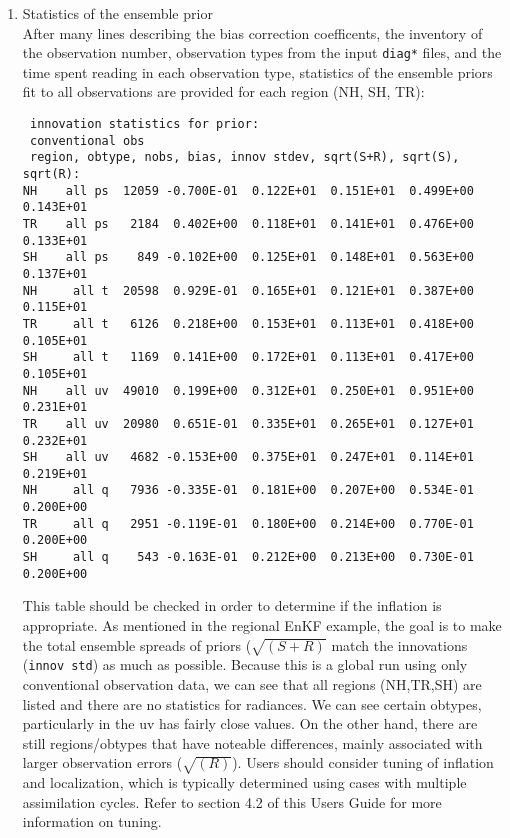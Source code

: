 \begin{enumerate}
\item Statistics of the ensemble prior \\
After many lines describing the bias correction coefficents, the inventory of the observation number, observation types from the input \verb|diag*| files, and the time spent reading in each observation type, statistics of the ensemble priors fit to all observations are provided for each region (NH, SH, TR):
\begin{footnotesize}
\begin{verbatim}
 innovation statistics for prior:
 conventional obs
 region, obtype, nobs, bias, innov stdev, sqrt(S+R), sqrt(S), sqrt(R):
NH    all ps  12059 -0.700E-01  0.122E+01  0.151E+01  0.499E+00  0.143E+01
TR    all ps   2184  0.402E+00  0.118E+01  0.141E+01  0.476E+00  0.133E+01
SH    all ps    849 -0.102E+00  0.125E+01  0.148E+01  0.563E+00  0.137E+01
NH     all t  20598  0.929E-01  0.165E+01  0.121E+01  0.387E+00  0.115E+01
TR     all t   6126  0.218E+00  0.153E+01  0.113E+01  0.418E+00  0.105E+01
SH     all t   1169  0.141E+00  0.172E+01  0.113E+01  0.417E+00  0.105E+01
NH    all uv  49010  0.199E+00  0.312E+01  0.250E+01  0.951E+00  0.231E+01
TR    all uv  20980  0.651E-01  0.335E+01  0.265E+01  0.127E+01  0.232E+01
SH    all uv   4682 -0.153E+00  0.375E+01  0.247E+01  0.114E+01  0.219E+01
NH     all q   7936 -0.335E-01  0.181E+00  0.207E+00  0.534E-01  0.200E+00
TR     all q   2951 -0.119E-01  0.180E+00  0.214E+00  0.770E-01  0.200E+00
SH     all q    543 -0.163E-01  0.212E+00  0.213E+00  0.730E-01  0.200E+00
\end{verbatim}
\end{footnotesize}
This table should be checked in order to determine if the inflation is appropriate. As mentioned in the regional EnKF example, the goal is to make the total ensemble spreads of priors ($\sqrt{(S+R)}$ match the innovations (\verb|innov std|) as much as possible. Because this is a global run using only conventional observation data, we can see that all regions (NH,TR,SH) are listed and there are no statistics for radiances. We can see certain obtypes, particularly in the uv has fairly close values. On the other hand, there are still regions/obtypes that have noteable differences, mainly associated with larger observation errors ($\sqrt{(R)}$). Users should consider tuning of inflation and localization, which is typically determined using cases with multiple assimilation cycles. Refer to section 4.2 of this User\textquotesingle s Guide for more information on tuning.\\


\end{enumerate}
